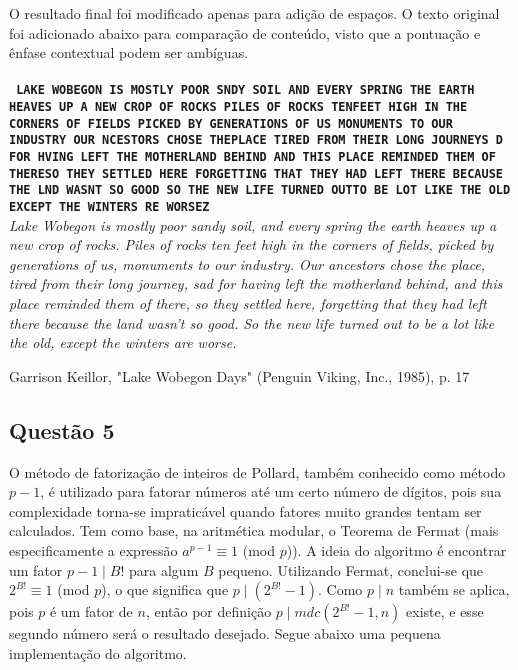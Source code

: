 \documentclass{article}
\begin{document}
O resultado final foi modificado apenas para adição de espaços. O texto original foi adicionado abaixo para comparação de conteúdo, visto que a pontuação e ênfase contextual podem ser ambíguas.\\
\\
\textbf{\texttt{\footnotesize
LAKE WOBEGON IS MOSTLY POOR SNDY SOIL AND EVERY SPRING THE EARTH HEAVES UP A NEW CROP OF ROCKS PILES OF ROCKS TEN\newline FEET HIGH IN THE CORNERS OF FIELDS PICKED BY GENERATIONS OF US MONUMENTS TO OUR INDUSTRY OUR NCESTORS CHOSE THE\newline PLACE TIRED FROM THEIR LONG JOURNEYS D FOR HVING LEFT THE MOTHERLAND BEHIND AND THIS PLACE REMINDED THEM OF THERE\newline SO THEY SETTLED HERE FORGETTING THAT THEY HAD LEFT THERE BECAUSE THE LND WASNT SO GOOD SO THE NEW LIFE TURNED OUT\newline TO BE LOT LIKE THE OLD EXCEPT THE WINTERS RE WORSEZ}} \newline
\\
\textit{Lake Wobegon is mostly poor sandy soil, and every spring the earth heaves up a new crop of rocks. Piles of rocks ten feet high in the corners of fields, picked by generations of us, monuments to our industry. Our ancestors chose the place, tired from their long journey, sad for having left the motherland behind, and this place reminded them of there, so they settled here, forgetting that they had left there because the land wasn't so good. So the new life turned out to be a lot like the old, except the winters are worse.}
\begin{flushright}
    Garrison Keillor, "Lake Wobegon Days" (Penguin Viking, Inc., 1985), p. 17
\end{flushright}
\subsection*{Questão 5}
O método de fatorização de inteiros de Pollard, também conhecido como método $p -1$, é utilizado para fatorar números até um certo número de dígitos, pois sua complexidade torna-se impraticável quando fatores muito grandes tentam ser calculados. Tem como base, na aritmética modular, o Teorema de Fermat (mais especificamente a expressão $a^{p-1} \equiv 1$ (mod $p$)). A ideia do algoritmo é encontrar um fator $p - 1 \mid B!$ para algum $B$ pequeno. Utilizando Fermat, conclui-se que $2^{B!} \equiv 1$ (mod $p$), o que significa que $p \mid (2^{B!} - 1)$. Como $p \mid n$ também se aplica, pois $p$ é um fator de $n$, então por definição $p \mid mdc(2^{B!} - 1, n)$ existe, e esse segundo número será o resultado desejado. Segue abaixo uma pequena implementação do algoritmo.
\end{document}
